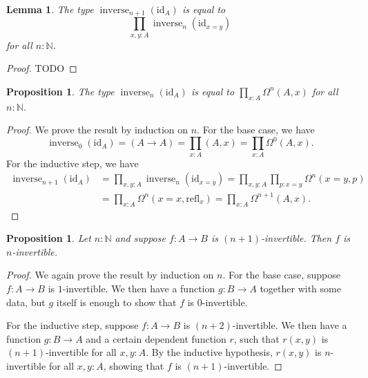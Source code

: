 \documentclass{article}
\theoremstyle{plain}
\newtheorem{proposition}[theorem]{Proposition}
\newtheorem{lemma}[theorem]{Lemma}
\theoremstyle{definition}
\theoremstyle{remark}
\newcommand{\id}{\mathrm{id}}
\newcommand{\refl}{\mathrm{refl}}
\newcommand{\N}{\mathbb{N}}
\newcommand{\lspace}[1]{\Omega^{#1}}
\DeclareMathOperator{\inverse}{inverse}
\newcommand{\ninverse}[1]{\inverse_{#1}}
\begin{document}
\begin{lemma}
  The type \(\ninverse{n + 1}(\id_{A})\) is equal to
  \[\prod_{x, y : A}\ninverse{n}(\id_{x = y})\]
  for all \(n : \N\).
\end{lemma}

\begin{proof}
  TODO
\end{proof}

\begin{proposition}
  \label{ninv-id}
  The type \(\ninverse{n}(\id_{A})\) is equal to \(\prod_{x : A}\lspace{n}(A, x)\)
  for all~\(n : \N\).
\end{proposition}

\begin{proof}
  We prove the result by induction on \(n\).
  For the base case, we have
  \[\ninverse{0}(\id_{A}) = (A \to A) =
    \prod_{x : A}(A, x) = \prod_{x : A}\lspace{0}(A, x).\]
  For the inductive step, we have
  \begin{align*}
    \ninverse{n + 1}{(\id_{A})} &= \prod_{x, y : A}\ninverse{n}(\id_{x = y}) =
                                  \prod_{x, y : A}\prod_{p : x = y}\lspace{n}(x = y, p) \\
                                &= \prod_{x : A} \lspace{n}(x = x, \refl_{x}) =
                                  \prod_{x : A}\lspace{n + 1}(A, x).
  \end{align*}
\end{proof}

\begin{proposition}
  \label{inverse-system}
  Let \(n : \N\) and suppose \(f : A \to B\) is \((n + 1)\)-invertible.
  Then \(f\) is \(n\)-invertible.
\end{proposition}

\begin{proof}
  We again prove the result by induction on \(n\). For the base case, suppose \(f : A \to B\)
  is \(1\)-invertible. We then have a function \(g : B \to A\) together with some data,
  but \(g\) itself is enough to show that \(f\) is \(0\)-invertible.

  For the inductive step,
  suppose \(f : A \to B\) is \((n + 2)\)-invertible. We then have a function
  \(g : B \to A\) and a certain dependent function \(r\), such that \(r(x, y)\) is
  \((n + 1)\)-invertible for all \(x, y : A\). By the inductive hypothesis, \(r(x, y)\) is
  \(n\)-invertible for all \(x, y : A\), showing that \(f\) is \((n + 1)\)-invertible.
\end{proof}
\end{document}
